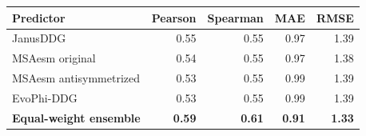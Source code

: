 \begin{tabular}{lrrrr}\toprule Predictor & Pearson & Spearman & MAE & RMSE\\\midrule
JanusDDG & 0.55 & 0.55 & 0.97 & 1.39 \\
MSAesm original & 0.54 & 0.55 & 0.97 & 1.38 \\
MSAesm antisymmetrized & 0.53 & 0.55 & 0.99 & 1.39 \\
EvoPhi-DDG & 0.53 & 0.55 & 0.99 & 1.39 \\
\textbf{Equal-weight ensemble} & \textbf{0.59} & \textbf{0.61} & \textbf{0.91} & \textbf{1.33} \\
\bottomrule\end{tabular}
